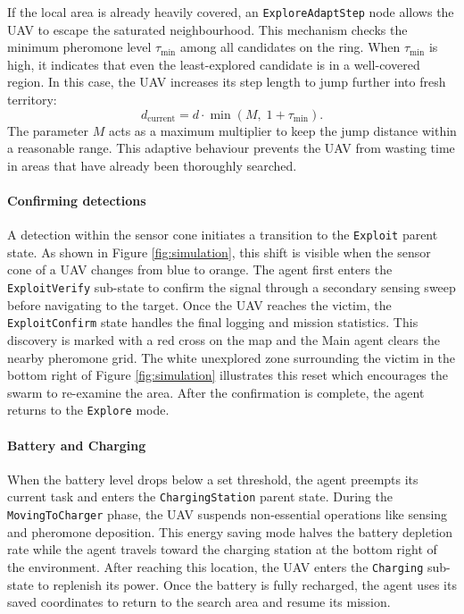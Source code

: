 If the local area is already heavily covered, an \texttt{ExploreAdaptStep} node allows the UAV to escape the saturated neighbourhood. This mechanism checks the minimum pheromone level $\tau_{\min}$ among all candidates on the ring. When $\tau_{\min}$ is high, it indicates that even the least-explored candidate is in a well-covered region. In this case, the UAV increases its step length to jump further into fresh territory:
\begin{equation}
    d_{\mathrm{current}} = d \cdot \min\left(M,\; 1 + \tau_{\min}\right) .
\end{equation}
The parameter $M$ acts as a maximum multiplier to keep the jump distance within a reasonable range. This adaptive behaviour prevents the UAV from wasting time in areas that have already been thoroughly searched.

\vspace{1cm}
\paragraph{Confirming detections}
A detection within the sensor cone initiates a transition to the \texttt{Exploit} parent state. As shown in Figure \ref{fig:simulation}, this shift is visible when the sensor cone of a UAV changes from blue to orange. The agent first enters the \texttt{ExploitVerify} sub-state to confirm the signal through a secondary sensing sweep before navigating to the target. Once the UAV reaches the victim, the \texttt{ExploitConfirm} state handles the final logging and mission statistics. This discovery is marked with a red cross on the map and the Main agent clears the nearby pheromone grid. The white unexplored zone surrounding the victim in the bottom right of Figure \ref{fig:simulation} illustrates this reset which encourages the swarm to re-examine the area. After the confirmation is complete, the agent returns to the \texttt{Explore} mode.

\paragraph{Battery and Charging}
When the battery level drops below a set threshold, the agent preempts its current task and enters the \texttt{ChargingStation} parent state. During the \texttt{MovingToCharger} phase, the UAV suspends non-essential operations like sensing and pheromone deposition. This energy saving mode halves the battery depletion rate while the agent travels toward the charging station at the bottom right of the environment. After reaching this location, the UAV enters the \texttt{Charging} sub-state to replenish its power. Once the battery is fully recharged, the agent uses its saved coordinates to return to the search area and resume its mission.
